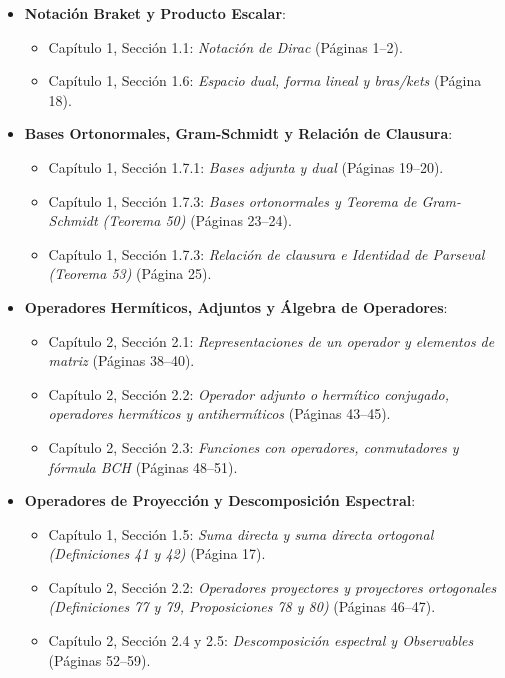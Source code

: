 \documentclass{article}
\begin{document}
\begin{itemize}
    \item \textbf{Notación Braket y Producto Escalar}:
    \begin{itemize}
        \item Capítulo 1, Sección 1.1: \emph{Notación de Dirac} (Páginas 1--2).
        \item Capítulo 1, Sección 1.6: \emph{Espacio dual, forma lineal y bras/kets} (Página 18).
    \end{itemize}
    \item \textbf{Bases Ortonormales, Gram-Schmidt y Relación de Clausura}:
    \begin{itemize}
        \item Capítulo 1, Sección 1.7.1: \emph{Bases adjunta y dual} (Páginas 19--20).
        \item Capítulo 1, Sección 1.7.3: \emph{Bases ortonormales y Teorema de Gram-Schmidt (Teorema 50)} (Páginas 23--24).
        \item Capítulo 1, Sección 1.7.3: \emph{Relación de clausura e Identidad de Parseval (Teorema 53)} (Página 25).
    \end{itemize}
    \item \textbf{Operadores Hermíticos, Adjuntos y Álgebra de Operadores}:
    \begin{itemize}
        \item Capítulo 2, Sección 2.1: \emph{Representaciones de un operador y elementos de matriz} (Páginas 38--40).
        \item Capítulo 2, Sección 2.2: \emph{Operador adjunto o hermítico conjugado, operadores hermíticos y antihermíticos} (Páginas 43--45).
        \item Capítulo 2, Sección 2.3: \emph{Funciones con operadores, conmutadores y fórmula BCH} (Páginas 48--51).
    \end{itemize}
    \item \textbf{Operadores de Proyección y Descomposición Espectral}:
    \begin{itemize}
        \item Capítulo 1, Sección 1.5: \emph{Suma directa y suma directa ortogonal (Definiciones 41 y 42)} (Página 17).
        \item Capítulo 2, Sección 2.2: \emph{Operadores proyectores y proyectores ortogonales (Definiciones 77 y 79, Proposiciones 78 y 80)} (Páginas 46--47).
        \item Capítulo 2, Sección 2.4 y 2.5: \emph{Descomposición espectral y Observables} (Páginas 52--59).
    \end{itemize}
\end{itemize}
\end{document}

